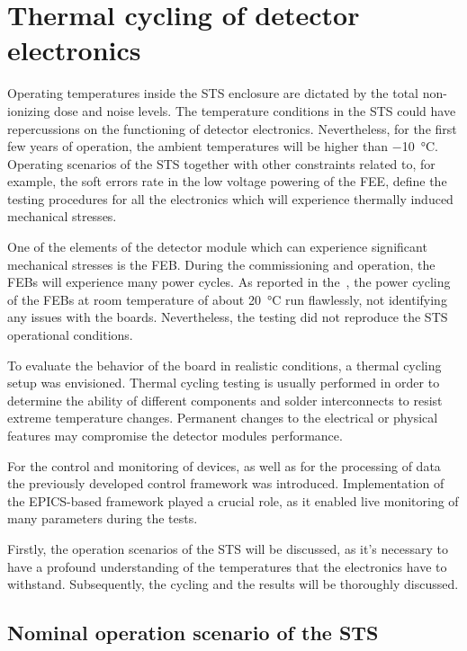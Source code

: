 \newpage
\section{Thermal cycling of detector electronics}
\label{thermal_cycling}
Operating temperatures inside the \gls{STS} enclosure are dictated by the total non-ionizing dose and noise levels. The temperature conditions in the STS could have repercussions on the functioning of detector electronics. Nevertheless, for the first few years of operation, the ambient temperatures will be higher than \SI{-10}{\celsius}. Operating scenarios of the \gls{STS} together with other constraints related to, for example, the soft errors rate in the low voltage powering of the \gls{FEE}, define the testing procedures for all the electronics which will experience thermally induced mechanical stresses.

One of the elements of the detector module which can experience significant mechanical stresses is the \gls{FEB}.
During the commissioning and operation, the \glspl{FEB} will experience many power cycles. As reported in the~\cite{CBM_PR_2021}, the power cycling of the \glspl{FEB} at room temperature of about \SI{20}{\celsius} run flawlessly, not identifying any issues with the boards. Nevertheless, the testing did not reproduce the STS operational conditions.

To evaluate the behavior of the board in realistic conditions, a thermal cycling setup was envisioned. Thermal cycling testing is usually performed in order to determine the ability of different components and solder interconnects to resist extreme temperature changes. Permanent changes to the electrical or physical features may compromise the detector modules performance.

 For the control and monitoring of devices, as well as for the processing of data the previously developed control framework was introduced. Implementation of the EPICS-based framework played a crucial role, as it enabled live monitoring of many parameters during the tests.

 Firstly, the operation scenarios of the \gls{STS} will be discussed, as it's necessary to have a profound understanding of the temperatures that the electronics have to withstand. Subsequently, the cycling and the results will be thoroughly discussed. 

\subsection{Nominal operation scenario of the STS}
\label{nominal}

